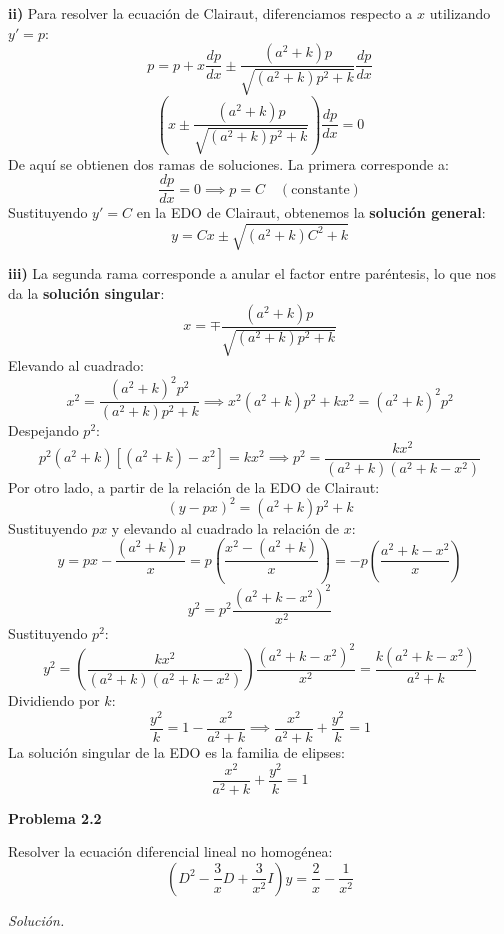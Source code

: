 \documentclass[12pt,letterpaper]{article}
\begin{document}
\medskip
\textbf{ii)} Para resolver la ecuación de Clairaut, diferenciamos respecto a $x$ utilizando $y' = p$:
\[
  p = p + x \frac{dp}{dx} \pm \frac{(a^2 + k)p}{\sqrt{(a^2 + k)p^2 + k}} \frac{dp}{dx}
\]
\[
  \left( x \pm \frac{(a^2 + k)p}{\sqrt{(a^2 + k)p^2 + k}} \right) \frac{dp}{dx} = 0
\]
De aquí se obtienen dos ramas de soluciones. La primera corresponde a:
\[
  \frac{dp}{dx} = 0 \implies p = C \quad (\text{constante})
\]
Sustituyendo $y' = C$ en la EDO de Clairaut, obtenemos la \textbf{solución general}:
\[
  y = Cx \pm \sqrt{(a^2 + k)C^2 + k}
\]

\medskip
\textbf{iii)} La segunda rama corresponde a anular el factor entre paréntesis, lo que nos da la \textbf{solución singular}:
\[
  x = \mp \frac{(a^2 + k)p}{\sqrt{(a^2 + k)p^2 + k}}
\]
Elevando al cuadrado:
\[
  x^2 = \frac{(a^2 + k)^2 p^2}{(a^2 + k)p^2 + k} \implies x^2 (a^2 + k)p^2 + k x^2 = (a^2 + k)^2 p^2
\]
Despejando $p^2$:
\[
  p^2 (a^2 + k)[(a^2 + k) - x^2] = k x^2 \implies p^2 = \frac{k x^2}{(a^2 + k)(a^2 + k - x^2)}
\]
Por otro lado, a partir de la relación de la EDO de Clairaut:
\[
  (y - px)^2 = (a^2 + k)p^2 + k
\]
Sustituyendo $px$ y elevando al cuadrado la relación de $x$:
\[
  y = px - \frac{(a^2 + k)p}{x} = p \left( \frac{x^2 - (a^2 + k)}{x} \right) = -p \left( \frac{a^2 + k - x^2}{x} \right)
\]
\[
  y^2 = p^2 \frac{(a^2 + k - x^2)^2}{x^2}
\]
Sustituyendo $p^2$:
\[
  y^2 = \left( \frac{k x^2}{(a^2 + k)(a^2 + k - x^2)} \right) \frac{(a^2 + k - x^2)^2}{x^2} = \frac{k(a^2 + k - x^2)}{a^2 + k}
\]
Dividiendo por $k$:
\[
  \frac{y^2}{k} = 1 - \frac{x^2}{a^2 + k} \implies \frac{x^2}{a^2 + k} + \frac{y^2}{k} = 1
\]
La solución singular de la EDO es la familia de elipses:
\[
  \frac{x^2}{a^2 + k} + \frac{y^2}{k} = 1
\]

\bigskip

\textbf{Problema 2.2}

\medskip
Resolver la ecuación diferencial lineal no homogénea:
\[
  \left(D^2 - \frac{3}{x}D + \frac{3}{x^2}I\right)y = \frac{2}{x} - \frac{1}{x^2}
\]

\medskip
\textit{Solución.}
\end{document}
